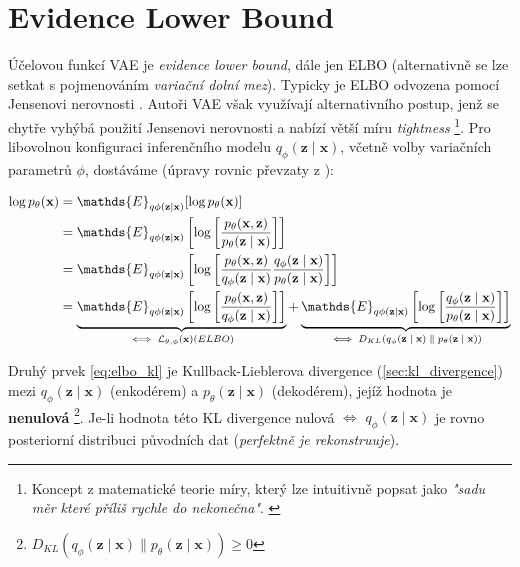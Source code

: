 \section{Evidence Lower Bound}
Účelovou funkcí VAE je \emph{evidence lower bound}, dále jen ELBO (alternativně se lze setkat s pojmenováním \emph{variační dolní mez}).
Typicky je ELBO odvozena pomocí Jensenovi nerovnosti \cite[Sekce 4.2]{Wasserman2013}.
Autoři VAE \cite{Kingma2014} však využívají alternativního postup, jenž se chytře vyhýbá použití Jensenovi nerovnosti a nabízí větší míru \emph{tightness}
\footnote{Koncept z matematické teorie míry, který lze intuitivně popsat jako \emph{"sadu měr které příliš rychle  do nekonečna"}. \cite{Topsoee1974}}. 
Pro libovolnou konfiguraci inferenčního modelu $q_\phi(\textbf{z}\mid\textbf{x})$, včetně volby variačních parametrů $\phi$, dostáváme (úpravy rovnic převzaty z \cite{Kingma2019}):

\begin{align}
    \log p_\theta(\textbf{x}) &= \mathds{E}_{q\phi(\textbf{z}\mid\textbf{x})}[\log p_\theta(\textbf{x})] \\
                              &= \mathds{E}_{q\phi(\textbf{z}\mid\textbf{x})} \left[ \log \left[ \frac{p_\theta(\textbf{x}, \textbf{z})}{p_\theta(\textbf{z}\mid\textbf{x})} \right] \right] \\
                              &= \mathds{E}_{q\phi(\textbf{z}\mid\textbf{x})} \left[ \log \left[ \frac{p_\theta(\textbf{x}, \textbf{z})}{q_\phi(\textbf{z}\mid\textbf{x})} \frac{q_\phi(\textbf{z}\mid\textbf{x})}{p_\theta(\textbf{z}\mid\textbf{x})} \right] \right] \\
                              &= \underbrace{ \mathds{E}_{q\phi(\textbf{z}\mid\textbf{x})} \left[ \log \left[ \frac{p_\theta(\textbf{x}, \textbf{z})}{q_\phi(\textbf{z}\mid\textbf{x})} \right] \right] }_\text{$ \iff \mathcal{L}_{\theta,\phi}(\textbf{x}) (ELBO)$} 
                              +  \underbrace{ \mathds{E}_{q\phi(\textbf{z}\mid\textbf{x})} \left[ \log \left[ \frac{q_\phi(\textbf{z}\mid\textbf{x})}{p_\theta(\textbf{z}\mid\textbf{x})} \right] \right] }_\text{$\iff D_{KL}(q_\phi(\textbf{z}\mid\textbf{x})\parallel p_\theta(\textbf{z}\mid\textbf{x}))$} \\ \label{eq:elbo_kl}
\end{align}

Druhý prvek \autoref{eq:elbo_kl} je Kullback-Lieblerova divergence (\autoref{sec:kl_divergence}) mezi $q_\phi(\textbf{z}\mid\textbf{x})$ (enkodérem) a $p_\theta(\textbf{z}\mid\textbf{x})$ (dekodérem), jejíž hodnota je \textbf{nenulová}
\footnote{$D_{KL}(q_\phi(\textbf{z}\mid\textbf{x})\parallel p_\theta(\textbf{z}\mid\textbf{x})) \geq 0$}.
Je-li hodnota této KL divergence nulová $\iff$ $q_\phi(\textbf{z}\mid\textbf{x})$ je rovno posteriorní distribuci původních dat (\emph{perfektně je rekonstruuje}). \cite{Kingma2019}


